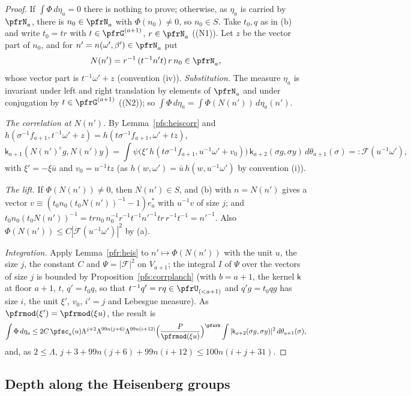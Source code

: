 \documentclass[10pt]{amsart}
\theoremstyle{definition}
\theoremstyle{remark}
\begin{document}
\begin{proof}
If $\int\Phi\,d\eta_a=0$ there is nothing to prove; otherwise, as $\eta_a$ is carried by $\pfrN_a$, there is
$n_0\in\pfrN_a$ with $\Phi(n_0)\ne0$, so $n_0\in S$. Take $t_0,q$ as in (b) and write $t_0=tr$ with
$t\in\pfrG^{(a+1)}$, $r\in\pfrN_a$ ((N1)). Let $z$ be the vector part of $n_0$, and for $n'=n(\omega',\beta')\in\pfrN_a$ put
\[
N(n')=r^{-1}\,(t^{-1}n't)\,r\,n_0\in\pfrN_a ,
\]
whose vector part is $t^{-1}\omega'+z$ (convention (iv)). \emph{Substitution.} The measure $\eta_a$ is invariant
under left and right translation by elements of $\pfrN_a$ and under conjugation by $t\in\pfrG^{(a+1)}$ ((N2)); so
$\int\Phi\,d\eta_a=\int\Phi(N(n'))\,d\eta_a(n')$.

\emph{The correlation at $N(n')$.} By Lemma~\ref{pfs:heiscorr} and $h(\sigma^{-1}f_{a+1},t^{-1}\omega'+z)=h(t\sigma^{-1}f_{a+1},
\omega'+tz)$,
\[
\mathsf k_{a+1}(N(n')^\varepsilon g,N(n')y)=\int\psi\bigl(\xi'\,h(t\sigma^{-1}f_{a+1},u^{-1}\omega'+v_0)\bigr)\,
\mathsf k_{a+2}(\sigma g,\sigma y)\,d\theta_{a+1}(\sigma)=:\mathcal F(u^{-1}\omega'),
\]
with $\xi'=-\xi\bar u$ and $v_0=u^{-1}tz$ (as $h(w,\omega')=\bar u\,h(w,u^{-1}\omega')$ by convention (i)).

\emph{The lift.} If $\Phi(N(n'))\ne0$, then $N(n')\in S$, and (b) with $n=N(n')$ gives a vector $v\equiv(t_0n_0(t_0
N(n'))^{-1}-1)e_a^*$ with $u^{-1}v$ of size $j$; and $t_0n_0(t_0N(n'))^{-1}=trn_0\,n_0^{-1}r^{-1}t^{-1}n'^{-1}tr\,r^{-1}t^{-1}=
n'^{-1}$. Also $\Phi(N(n'))\le C|\mathcal F(u^{-1}\omega')|^2$ by (a).

\emph{Integration.} Apply Lemma~\ref{pfr:heis} to $n'\mapsto\Phi(N(n'))$ with the unit $u$, the size $j$, the
constant $C$ and $\Psi=|\mathcal F|^2$ on $V_{a+1}$; the integral $I$ of $\Psi$ over the vectors of size $j$
is bounded by Proposition~\ref{pfs:corrplanch} (with $b=a+1$, the kernel $\mathsf k$ at floor $a+1$, $t$, $q'=t_0q$, so that
$t^{-1}q'=rq\in\pfrU_{(<a+1)}$ and $q'g=t_0qg$ has size $i$, the unit $\xi'$, $v_0$, $i'=j$ and Lebesgue measure).
As $\pfrmod(\xi')=\pfrmod(\xi u)$, the result is
\[
\int\Phi\,d\eta_a\le 2C\,\pfsc_a(u)\Lambda^{j+2}\Lambda^{99n(j+6)}\Lambda^{99n(i+12)}\Bigl(\frac P{\pfrmod(\xi u)}\Bigr)^{\pfsrk}
\int|\mathsf k_{a+2}(\sigma g,\sigma y)|^2\,d\theta_{a+1}(\sigma),
\]
and, as $2\le\Lambda$, $j+3+99n(j+6)+99n(i+12)\le100n(i+j+31)$.
\end{proof}

\subsection{Depth along the Heisenberg groups}\label{pfs:ss-depth}
\end{document}

